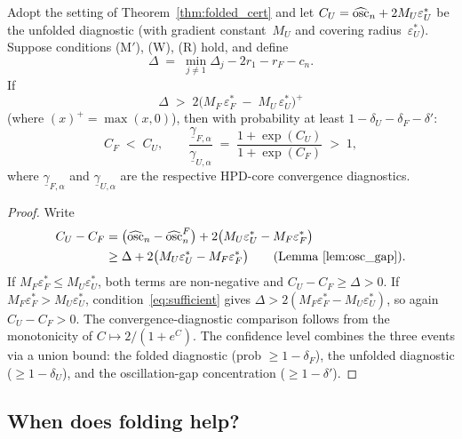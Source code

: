 \begin{theorem}\label{thm:gap_improvement}
  Adopt the setting of Theorem~\ref{thm:folded_cert} and let
  $C_U = \widehat{\mathrm{osc}}_n + 2 M_U \varepsilon_U^*$ be the unfolded
  diagnostic (with gradient constant~$M_U$ and covering
  radius~$\varepsilon_U^*$).
  Suppose conditions \textup{(M$'$)}, \textup{(W)}, \textup{(R)}
  hold, and define
  \[
    \Delta
    \;=\;
    \min_{j \neq 1}\Delta_j - 2r_1 - r_F - c_n.
  \]
  If
  \begin{equation}\label{eq:sufficient}
    \Delta
    \;>\;
    2\bigl(M_F\,\varepsilon_F^*
    \;-\; M_U\,\varepsilon_U^*\bigr)^{\!+}
  \end{equation}
  (where $(x)^+ = \max(x,0)$), then with probability at least
  $1 - \delta_U - \delta_F - \delta'$:
  \begin{equation}\label{eq:C_comparison}
    C_F \;<\; C_U,
    \qquad
    \frac{\underline{\gamma}_{F,\alpha}}{\underline{\gamma}_{U,\alpha}}
    \;=\;
    \frac{1 + \exp(C_U)}{1 + \exp(C_F)}
    \;>\; 1,
  \end{equation}
  where $\underline{\gamma}_{F,\alpha}$ and
  $\underline{\gamma}_{U,\alpha}$ are the respective HPD-core
  convergence diagnostics.
\end{theorem}

\begin{proof}
  Write
  \begin{align*}
    C_U - C_F
    &= \bigl(\widehat{\mathrm{osc}}_n - \widehat{\mathrm{osc}}_n^F\bigr)
       + 2\bigl(M_U\varepsilon_U^* - M_F\varepsilon_F^*\bigr) \\
    &\geq \Delta + 2\bigl(M_U\varepsilon_U^* - M_F\varepsilon_F^*\bigr)
      \qquad\text{(Lemma~\ref{lem:osc_gap})}.
  \end{align*}
  If $M_F\varepsilon_F^* \leq M_U\varepsilon_U^*$, both terms are
  non-negative and $C_U - C_F \geq \Delta > 0$.
  If $M_F\varepsilon_F^* > M_U\varepsilon_U^*$,
  condition~\eqref{eq:sufficient} gives
  $\Delta > 2(M_F\varepsilon_F^* - M_U\varepsilon_U^*)$, so again
  $C_U - C_F > 0$.  The convergence-diagnostic comparison follows
  from the monotonicity of $C \mapsto 2/(1 + e^C)$.
  The confidence level combines the three events via a union bound:
  the folded diagnostic (prob $\geq 1 - \delta_F$), the unfolded
  diagnostic ($\geq 1 - \delta_U$), and the oscillation-gap
  concentration ($\geq 1 - \delta'$).
\end{proof}


\subsection{When does folding help?}
\label{sec:when_folding_helps}

